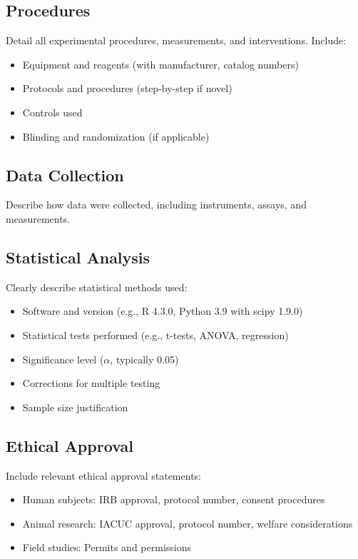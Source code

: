 \documentclass[10pt,letterpaper]{article}
\begin{document}
\subsection*{Procedures}
Detail all experimental procedures, measurements, and interventions. Include:
\begin{itemize}
    \item Equipment and reagents (with manufacturer, catalog numbers)
    \item Protocols and procedures (step-by-step if novel)
    \item Controls used
    \item Blinding and randomization (if applicable)
\end{itemize}

\subsection*{Data Collection}
Describe how data were collected, including instruments, assays, and measurements.

\subsection*{Statistical Analysis}
Clearly describe statistical methods used:
\begin{itemize}
    \item Software and version (e.g., R 4.3.0, Python 3.9 with scipy 1.9.0)
    \item Statistical tests performed (e.g., t-tests, ANOVA, regression)
    \item Significance level ($\alpha$, typically 0.05)
    \item Corrections for multiple testing
    \item Sample size justification
\end{itemize}

\subsection*{Ethical Approval}
Include relevant ethical approval statements:
\begin{itemize}
    \item Human subjects: IRB approval, protocol number, consent procedures
    \item Animal research: IACUC approval, protocol number, welfare considerations
    \item Field studies: Permits and permissions
\end{itemize}
\end{document}
